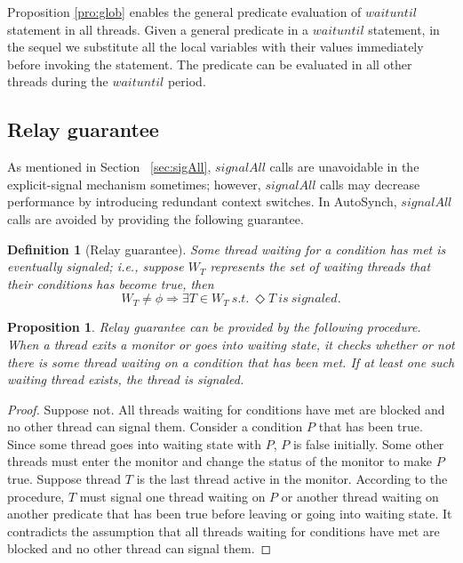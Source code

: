 \documentclass[preprint]{sigplanconf}
\newtheorem{definition}{Definition}
\newtheorem{proposition}{Proposition}
\begin{document}
Proposition \ref{pro:glob} enables the general predicate evaluation of
$waituntil$ statement in all threads. 
Given a general predicate in a $waituntil$ statement, in the sequel we substitute
all the local variables with their values immediately before invoking the
statement. The predicate can be evaluated in all other threads during the
$waituntil$ period. 

\subsection{Relay guarantee}
As mentioned in Section ~\ref{sec:sigAll}, $signalAll$ calls are unavoidable in
the explicit-signal mechanism sometimes; however, $signalAll$ calls may decrease
performance by introducing redundant context switches. 
In
AutoSynch, $signalAll$ calls are avoided by providing the following guarantee. 

\begin{definition}[Relay guarantee]
    Some thread waiting for a condition has met is eventually signaled; i.e., 
    suppose $W_T$ represents the set of waiting threads that their conditions 
    has become true, then
    \[
        W_T \ne \phi \Rightarrow \exists T \in W_T\ s.t.\ \Diamond T\ 
        is\ signaled.  
    \]
    
\end{definition}
\begin{proposition} \label{pro:one}
    Relay guarantee can be provided by the following procedure. When a thread 
    exits a monitor or goes into waiting state, it checks whether or not there 
    is some thread waiting on a condition that has been met. If
    at least one such waiting thread exists, the thread is signaled.
\end{proposition}
\begin{proof}
    Suppose not. All threads waiting for conditions have met are blocked and 
    no other thread can signal them. Consider a condition $P$ that has been 
    true. Since some thread goes into waiting state with $P$, $P$ is false
    initially. Some other threads must enter the monitor and change the status 
    of the monitor to make $P$ true. Suppose thread $T$ is the last thread 
    active in the monitor. According to the procedure, $T$ must signal one 
    thread waiting on $P$ or another thread waiting on another predicate that
    has been true before leaving or going into waiting state. It contradicts
    the assumption that all threads waiting for conditions have met are
    blocked and no other thread can signal them.   
 \end{proof}
\end{document}
